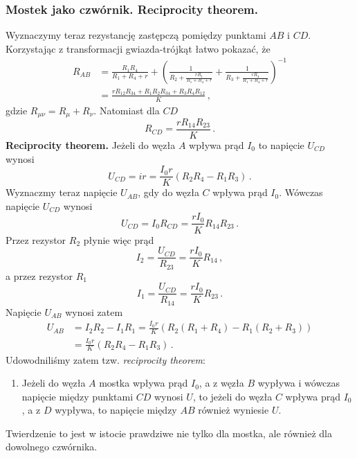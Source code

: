 \documentclass[../main.tex]{subfiles}
\begin{document}
\subsubsection{Mostek jako czwórnik. Reciprocity theorem.}
Wyznaczymy teraz rezystancję zastępczą pomiędzy punktami \(AB\) i \(CD\). Korzystając z
transformacji gwiazda-trójkąt łatwo pokazać, że
\begin{equation*}
\begin{split}
    R_{AB}&=\frac{R_1R_4}{R_1+R_4+r}+\left(\frac{1}{R_2+\frac{rR_1}{R_1+R_4+r}}+\frac{1}{R_3+\frac{rR_4}{R_1+R_4+r}}\right)^{-1}\\
    &=\frac{rR_{12}R_{34}+R_1R_2R_{34}+R_3R_4R_{12}}{K}\,,
\end{split}
\end{equation*}
gdzie \(R_{\mu\nu}=R_\mu+R_\nu\). Natomiast dla \(CD\)
\begin{equation*}
    R_{CD}=\frac{rR_{14}R_{23}}{K}\,.
\end{equation*}
\textbf{Reciprocity theorem.} 
Jeżeli do węzła \(A\) wpływa prąd \(I_0\) to napięcie \(U_{CD}\) wynosi
\begin{equation*}
    U_{CD}=ir=\frac{I_0r}{K}(R_2R_4-R_1R_3)\,.
\end{equation*}
Wyznaczmy teraz napięcie \(U_{AB}\), gdy do węzła \(C\) wpływa prąd \(I_0\). Wówczas napięcie
\(U_{CD}\) wynosi
\begin{equation*}
    U_{CD}=I_0R_{CD}=\frac{rI_0}{K}R_{14}R_{23}\,.
\end{equation*}
Przez rezystor \(R_2\) płynie więc prąd
\begin{equation*}
    I_2=\frac{U_{CD}}{R_{23}}=\frac{rI_0}{K}R_{14}\,,
\end{equation*}
a przez rezystor \(R_1\)
\begin{equation*}
    I_1=\frac{U_{CD}}{R_{14}}=\frac{rI_0}{K}R_{23}\,.
\end{equation*}
Napięcie \(U_{AB}\) wynosi zatem
\begin{equation*}
\begin{split}
    U_{AB}&=I_2R_2-I_1R_1=\frac{I_0r}{K}\left(R_2(R_1+R_4)-R_1(R_2+R_3)\right)\\
    &=\frac{I_0r}{K}(R_2R_4-R_1R_3)\,.
\end{split}
\end{equation*}
Udowodniliśmy zatem tzw. \textit{reciprocity theorem}:
\begin{enumerate}[]
    \item{Jeżeli do węzła \(A\) mostka wpływa prąd \(I_0\), a z węzła \(B\) wypływa i wówczas napięcie między punktami \(CD\) wynosi \(U\), to jeżeli do węzła \(C\) wpływa prąd \(I_0\), a z \(D\) wypływa, to napięcie między \(AB\) również wyniesie \(U\).}
\end{enumerate}
Twierdzenie to jest w istocie prawdziwe nie tylko dla mostka, ale również dla dowolnego czwórnika.
\end{document}
